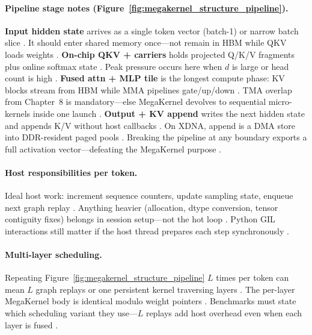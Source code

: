 \paragraph{Pipeline stage notes (Figure~\ref{fig:megakernel_structure_pipeline}).}
\textbf{Input hidden state} arrives as a single token vector (batch-1) or narrow batch slice \citep{patel2025llminference,dlbook}.
It should enter shared memory once---not remain in HBM while QKV loads weights \citep{semianalysis2024tma,memoryfloor2026}.
\textbf{On-chip QKV + carriers} holds projected Q/K/V fragments plus online softmax state \citep{dao2022flashattention}.
Peak pressure occurs here when $d$ is large or head count is high \citep{liu2024deepseekv3,nvidia2022hopper}.
\textbf{Fused attn + MLP tile} is the longest compute phase: KV blocks stream from HBM while MMA pipelines gate/up/down \citep{dao2023flashdecoding,taxbreak2026}.
TMA overlap from Chapter~8 is mandatory---else MegaKernel devolves to sequential micro-kernels inside one launch \citep{semianalysis2024tma,chen2020compilerbasedhardw}.
\textbf{Output + KV append} writes the next hidden state and appends K/V without host callbacks \citep{kwon2023vllm,nvidia2024cudagraphs}.
On XDNA, append is a DMA store into DDR-resident paged pools \citep{amd2024xdna,amd2024aie}.
Breaking the pipeline at any boundary exports a full activation vector---defeating the MegaKernel purpose \citep{memoryfloor2026,taxbreak2026,yirage2026}.

\paragraph{Host responsibilities per token.} Ideal host work: increment sequence counters, update sampling state, enqueue next graph replay \citep{nvidia2024cudagraphs,kwon2023vllm}. Anything heavier (allocation, dtype conversion, tensor contiguity fixes) belongs in session setup---not the hot loop \citep{memoryfloor2026,taxbreak2026}. Python GIL interactions still matter if the host thread prepares each step synchronously \citep{patel2025llminference,dlbook}.

\paragraph{Multi-layer scheduling.} Repeating Figure~\ref{fig:megakernel_structure_pipeline} $L$ times per token can mean $L$ graph replays or one persistent kernel traversing layers \citep{liu2024deepseekv3,nvidia2024cudagraphs}. The per-layer MegaKernel body is identical modulo weight pointers \citep{yirage2026,chen2020compilerbasedhardw}. Benchmarks must state which scheduling variant they use---$L$ replays add host overhead even when each layer is fused \citep{taxbreak2026,memoryfloor2026}.

